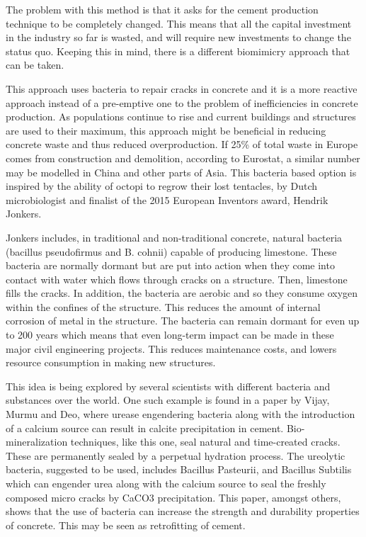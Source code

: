 The problem with this method is that it asks for the cement production technique to be completely changed. This means that all the capital investment in the industry so far is wasted, and will require new investments to change the status quo. Keeping this in mind, there is a different biomimicry approach that can be taken.

This approach uses bacteria to repair cracks in concrete and it is a more reactive approach instead of a pre-emptive one to the problem of inefficiencies in concrete production.  As populations continue to rise and current buildings and structures are used to their maximum, this approach might be beneficial in reducing concrete waste and thus reduced overproduction. If 25\% of total waste in Europe comes from construction and demolition, according to Eurostat, a similar number may be modelled in China and other parts of Asia.  This bacteria based option is inspired by the ability of octopi to regrow their lost tentacles, by Dutch microbiologist and finalist of the 2015 European Inventors award, Hendrik Jonkers.

Jonkers includes, in traditional and non-traditional concrete, natural bacteria (bacillus pseudofirmus and B. cohnii) capable of producing limestone.  These bacteria are normally dormant but are put into action when they come into contact with water which flows through cracks on a structure. Then, limestone fills the cracks. In addition, the bacteria are aerobic and so they consume oxygen within the confines of the structure. This reduces the amount of internal corrosion of metal in the structure. The bacteria can remain dormant for even up to 200 years which means that even long-term impact can be made in these major civil engineering projects. This reduces maintenance costs, and lowers resource consumption in making new structures.

This idea is being explored by several scientists with different bacteria and substances over the world. One such example is found in a paper by Vijay, Murmu and Deo,  where urease engendering bacteria along with the introduction of a calcium source can result in calcite precipitation in cement. Bio-mineralization techniques, like this one, seal natural and time-created cracks. These are permanently sealed by a perpetual hydration process. The ureolytic bacteria, suggested to be used, includes Bacillus Pasteurii, and Bacillus Subtilis which can engender urea along with the calcium source to seal the freshly composed micro cracks by CaCO3 precipitation. This paper, amongst others, shows that the use of bacteria can increase the strength and durability properties of concrete. This may be seen as retrofitting of cement.

